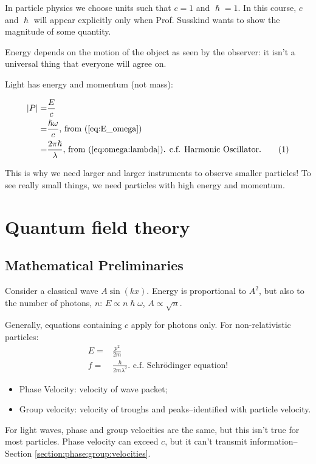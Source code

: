 \documentclass[]{article}
\newcommand\numberthis{\addtocounter{equation}{1}\tag{\theequation}}
\newcommand{\Schr}{{Schr\"odinger }}
\begin{document}
In particle physics we choose units such that $c=1$ and $\hslash=1$. In this course, $c$ and $\hslash$ will appear explicitly only when Prof. Susskind wants to show the magnitude of some quantity.

Energy depends on the motion of the object as seen by the observer: it isn't a universal thing that everyone will agree on.

Light has energy and momentum (not mass): 

\begin{align*}
	\left|P\right|=&\frac{E}{c} \\
	=&\frac{\hslash \omega}{c} \text{, from (\ref{eq:E_omega})}\\
	=& \frac{2 \pi \hslash}{\lambda} \text{, from (\ref{eq:omega:lambda}). c.f. Harmonic Oscillator.}\numberthis\label{eq:P:lambda}
\end{align*}

This is why we need larger and larger instruments to observe smaller particles!
To see really small things, we need particles with high energy and momentum.


\section{Quantum field theory}

\subsection{Mathematical Preliminaries}

Consider a classical wave $A \sin(kx)$. Energy is proportional to $A^2$, but also to the number of photons, $n$: $E \propto n \hslash \omega$, $A \propto \sqrt{n}$.

Generally, equations containing $c$ apply for photons only. For non-relativistic particles:
\begin{align*}
	E=&\frac{p^2}{2m}\\
	f =& \frac{h}{2 m \lambda^2} \text{. c.f. \Schr equation!}
\end{align*}

\begin{itemize}
	\item Phase Velocity: velocity of wave packet;
	\item Group velocity: velocity of troughs and peaks--identified with particle velocity.
\end{itemize}

For light waves, phase and group velocities are the same, but this isn't true for most particles. Phase velocity can exceed $c$, but it can't transmit information--Section \ref{section:phase:group:velocities}.
\end{document}
